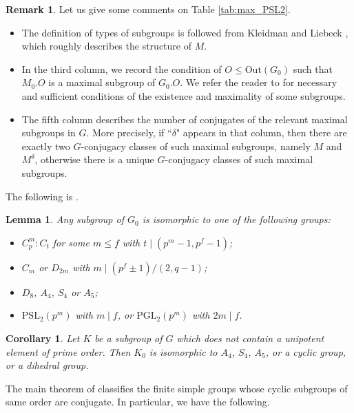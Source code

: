 \documentclass[twoside,a4paper,reqno,11pt]{amsart}
\newcommand{\<}{\langle}
\renewcommand{\>}{\rangle}
\newcommand{\leqs}{\leqslant}
\newcommand{\Out}{\mathrm{Out}}
\newcommand{\PSL}{\mathrm{PSL}}
\newcommand{\PGL}{\mathrm{PGL}}
\newtheorem{lem}[thm]{Lemma}
\newtheorem{cor}[thm]{Corollary}
\theoremstyle{definition}
\newtheorem{rem}[thm]{Remark}
\begin{document}
	\begin{rem}
		\label{r:tab:max_PSL2}
		Let us give some comments on Table \ref{tab:max_PSL2}.
		\begin{itemize}\addtolength{\itemsep}{0.2\baselineskip}
			\item[{\rm (i)}] The definition of types of subgroups is followed from Kleidman and Liebeck \cite{KL_classical}, which roughly describes the structure of $M$.
			\item[{\rm (ii)}] In the third column, we record the condition of $O\leqs\Out(G_0)$ such that $M_0.O$ is a maximal subgroup of $G_0.O$. We refer the reader to \cite[Tables 8.1 and 8.2]{BHR_classical} for necessary and sufficient conditions of the existence and maximality of some subgroups.
			\item[{\rm (iii)}] The fifth column describes the number of conjugates of the relevant maximal subgroups in $G$. More precisely, if ``$\delta$" appears in that column, then there are exactly two $G$-conjugacy classes of such maximal subgroups, namely $M$ and $M^\delta$, otherwise there is a unique $G$-conjugacy classes of such maximal subgroups.
		\end{itemize}
	\end{rem}
	
	The following is \cite[Satz 8.27]{H_book}.
	
	\begin{lem}
		\label{l:PSL2_sub}
		Any subgroup of $G_0$ is isomorphic to one of the following groups:
		\begin{itemize}\addtolength{\itemsep}{0.2\baselineskip}
			\item[{\rm (i)}] $C_p^m{:}C_t$ for some $m\leqs f$ with $t\mid (p^m-1,p^f-1)$;
			\item[{\rm (ii)}] $C_m$ or $D_{2m}$ with $m\mid (p^f\pm 1)/(2,q-1)$;
			\item[{\rm (iii)}] $D_8$, $A_4$, $S_4$ or $A_5$;
			\item[{\rm (iv)}] $\PSL_2(p^m)$ with $m\mid f$, or $\PGL_2(p^m)$ with $2m\mid f$.
		\end{itemize}
	\end{lem}
	
	\begin{cor}
		\label{c:PSL2_p-element}
		Let $K$ be a subgroup of $G$ which does not contain a unipotent element of prime order. Then $K_0$ is isomorphic to $A_4$, $S_4$, $A_5$, or a cyclic group, or a dihedral group.
	\end{cor}
	
	The main theorem of \cite{CJ_cyclic} classifies the finite simple groups whose cyclic subgroups of same order are conjugate. In particular, we have the following.
	
\end{document}

